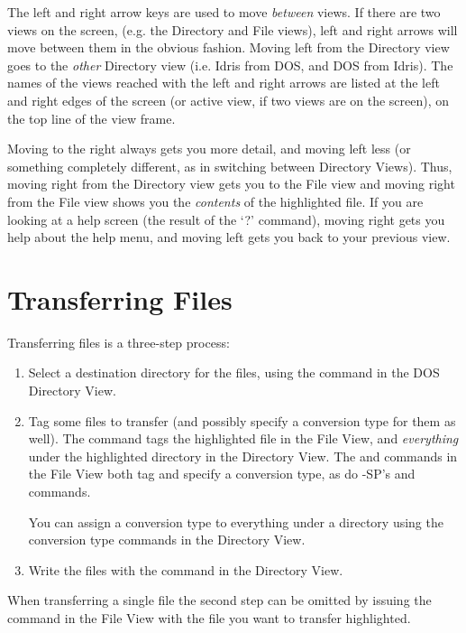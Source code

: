 The left and right arrow keys are used to move {\em between} views.
If there are two views on the screen, (e.g. the Directory and File
views), left and right arrows will move between them in the obvious
fashion.  Moving left from the Directory view goes to the {\em other}
Directory view (i.e. Idris from DOS, and DOS from Idris). 
The names of the views reached with the left and right arrows are
listed at the left and right edges of the screen (or active view, if
two views are on the screen), on the top line of the view frame.

Moving to the right always gets you more detail, and moving left less
(or something completely different, as in switching between Directory
Views).  Thus, moving right from the Directory view gets you to the
File view and moving right from the File view shows you the {\em
contents} of the highlighted file.  If you are looking at a help
screen (the result of the `?' command), moving right gets you help
about the help menu, and moving left gets you back to your previous
view.
 
 
\section{Transferring Files}
 

Transferring files is a three-step process:

\begin{enumerate}
\item 
Select a destination directory for the files, using the 
command in the DOS Directory View.

\item 
Tag some files to transfer (and possibly specify a conversion type for
them as well).  The  command tags the highlighted
file in the File View, and {\em everything} under the highlighted
directory in the Directory View.  The  and 
commands in the File View both tag and specify a
conversion type, as do \RD-SP's 
and  commands.  

You can assign a conversion type to everything under a directory using
the conversion type commands in the Directory View.

\item
Write the files with the  command in the
Directory View.

\end{enumerate}

\noindent
When transferring a single file the second step can be omitted by
issuing the  command in the File View with the
file you want to transfer highlighted.

